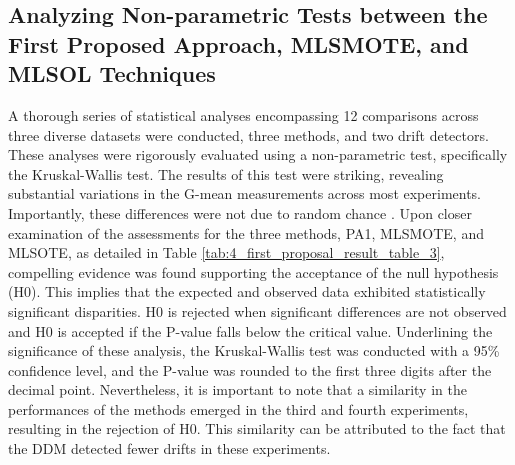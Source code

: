 \begin{table}[h!]
  \centering
  \caption{Runtimes (in seconds) Comparison of PA1, MLSMOTE, and MLSOL.}
  \label{tab:4_first_proposal_result_table_2}
  \end{table}

\subsection{Analyzing Non-parametric Tests between the First Proposed Approach, MLSMOTE, and MLSOL Techniques}
A thorough series of statistical analyses encompassing 12 comparisons across three diverse datasets were conducted, three methods, and two drift detectors. These analyses were rigorously evaluated using a non-parametric test, specifically the Kruskal-Wallis test. The results of this test were striking, revealing substantial variations in the G-mean measurements across most experiments. Importantly, these differences were not due to random chance \cite{yamada2013change}. Upon closer examination of the assessments for the three methods, PA1, MLSMOTE, and MLSOTE, as detailed in Table \ref{tab:4_first_proposal_result_table_3}, compelling evidence was found supporting the acceptance of the null hypothesis (H0).
This implies that the expected and observed data exhibited statistically significant disparities. H0 is rejected when significant differences are not observed and H0 is accepted if the P-value falls below the critical value. Underlining the significance of these analysis, the Kruskal-Wallis test was conducted with a 95\% confidence level, and the P-value was rounded to the first three digits after the decimal point. Nevertheless, it is important to note that a similarity in the performances of the methods emerged in the third and fourth experiments, resulting in the rejection of H0. This similarity can be attributed to the fact that the DDM detected fewer drifts in these experiments.


